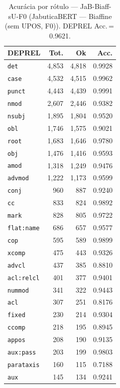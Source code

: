 \begin{table}[ht]
\centering
\caption{Acurácia por rótulo --- JaB-Biaff-sU-F0 (JabuticaBERT — Biaffine (sem UPOS, F0)). DEPREL Acc.\,=\,0.9621.}
\label{tab:acc-predict-test-ablacao-biaffine-amadeusai-modernJabuticaBERT-Base-1k-fold0}
\scriptsize
\begin{tabular}{lrrr}
\toprule
\textbf{DEPREL} & \textbf{Tot.} & \textbf{Ok} & \textbf{Acc.} \\
\midrule
\texttt{det} & 4,853 & 4,818 & 0.9928 \\
\texttt{case} & 4,532 & 4,515 & 0.9962 \\
\texttt{punct} & 4,443 & 4,439 & 0.9991 \\
\texttt{nmod} & 2,607 & 2,446 & 0.9382 \\
\texttt{nsubj} & 1,895 & 1,804 & 0.9520 \\
\texttt{obl} & 1,746 & 1,575 & 0.9021 \\
\texttt{root} & 1,683 & 1,646 & 0.9780 \\
\texttt{obj} & 1,476 & 1,416 & 0.9593 \\
\texttt{amod} & 1,318 & 1,249 & 0.9476 \\
\texttt{advmod} & 1,222 & 1,173 & 0.9599 \\
\texttt{conj} & 960 & 887 & 0.9240 \\
\texttt{cc} & 833 & 824 & 0.9892 \\
\texttt{mark} & 828 & 805 & 0.9722 \\
\texttt{flat\!:\!name} & 686 & 657 & 0.9577 \\
\texttt{cop} & 595 & 589 & 0.9899 \\
\texttt{xcomp} & 475 & 443 & 0.9326 \\
\texttt{advcl} & 437 & 385 & 0.8810 \\
\texttt{acl\!:\!relcl} & 401 & 377 & 0.9401 \\
\texttt{nummod} & 341 & 322 & 0.9443 \\
\texttt{acl} & 307 & 251 & 0.8176 \\
\texttt{fixed} & 230 & 214 & 0.9304 \\
\texttt{ccomp} & 218 & 195 & 0.8945 \\
\texttt{appos} & 208 & 190 & 0.9135 \\
\texttt{aux\!:\!pass} & 203 & 199 & 0.9803 \\
\texttt{parataxis} & 160 & 115 & 0.7188 \\
\texttt{aux} & 145 & 134 & 0.9241 \\

\end{tabular}
\end{table}
